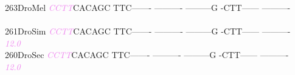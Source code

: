 \documentclass[11pt,twoside,reqno,a4paper]{article}
\begin{document}
{263\hspace*{1\charwidth}DroMel	\textit{\textcolor{violet}{C}}\textit{\textcolor{violet}{C}}\textit{\textcolor{violet}{T}}\textit{\textcolor{violet}{T}}CACAGC	TTC-------	----------	---------G	-CTT------	----------	\\
\hspace*{4\charwidth}\hspace*{7\charwidth}\hspace*{1\charwidth}\hspace*{1\charwidth}\hspace*{1\charwidth}\hspace*{1\charwidth}\hspace*{1\charwidth}\hspace*{1\charwidth}\\
261\hspace*{1\charwidth}DroSim	\textit{\textcolor{violet}{C}}\textit{\textcolor{violet}{C}}\textit{\textcolor{violet}{T}}\textit{\textcolor{violet}{T}}CACAGC	TTC-------	----------	---------G	-CTT------	----------	\\
\hspace*{4\charwidth}\hspace*{7\charwidth}\hspace*{0\charwidth}\textit{\textcolor{violet}{12.0}}\hspace*{1\charwidth}\hspace*{1\charwidth}\hspace*{1\charwidth}\hspace*{1\charwidth}\hspace*{1\charwidth}\hspace*{1\charwidth}\\
260\hspace*{1\charwidth}DroSec	\textit{\textcolor{violet}{C}}\textit{\textcolor{violet}{C}}\textit{\textcolor{violet}{T}}\textit{\textcolor{violet}{T}}CACAGC	TTC-------	----------	---------G	-CTT------	----------	\\
\hspace*{4\charwidth}\hspace*{7\charwidth}\hspace*{0\charwidth}\textit{\textcolor{violet}{12.0}}\hspace*{1\charwidth}\hspace*{1\charwidth}\hspace*{1\charwidth}\hspace*{1\charwidth}\hspace*{1\charwidth}\hspace*{1\charwidth}\\
}
\end{document}
